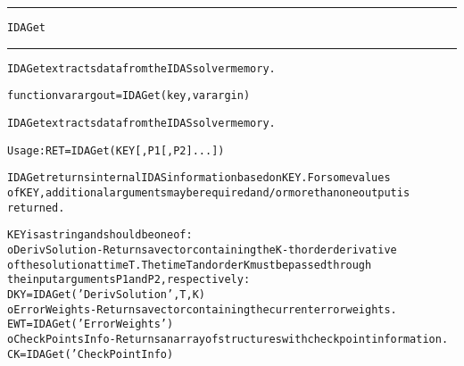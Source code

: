 \begin{samepage}
\hrule
\begin{center}
{\large \verb!IDAGet!}
\label{p:IDAGet}
\end{center}
\hrule\vspace{0.1in}



\begin{alltt}
IDAGet extracts data from the IDAS solver memory.
\end{alltt}

\end{samepage}



\begin{samepage}


\begin{alltt}
function varargout = IDAGet(key, varargin) 
\end{alltt}

\end{samepage}



\begin{alltt}
IDAGet extracts data from the IDAS solver memory.

   Usage: RET = IDAGet ( KEY [, P1 [, P2] ... ]) 

   IDAGet returns internal IDAS information based on KEY. For some values
   of KEY, additional arguments may be required and/or more than one output is
   returned.

   KEY is a string and should be one of:
    o DerivSolution - Returns a vector containing the K-th order derivative
       of the solution at time T. The time T and order K must be passed through 
       the input arguments P1 and P2, respectively:
       DKY = IDAGet('DerivSolution', T, K)
    o ErrorWeights - Returns a vector containing the current error weights.
       EWT = IDAGet('ErrorWeights')
    o CheckPointsInfo - Returns an array of structures with check point information.
       CK = IDAGet('CheckPointInfo)
\end{alltt}






\vspace{0.1in}
